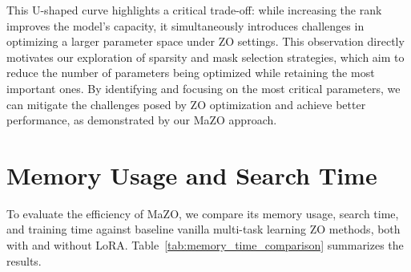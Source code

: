 This U-shaped curve highlights a critical trade-off: while increasing the rank improves the model's capacity, it simultaneously introduces challenges in optimizing a larger parameter space under ZO settings. This observation directly motivates our exploration of sparsity and mask selection strategies, which aim to reduce the number of parameters being optimized while retaining the most important ones. By identifying and focusing on the most critical parameters, we can mitigate the challenges posed by ZO optimization and achieve better performance, as demonstrated by our MaZO approach.

\section{Memory Usage and Search Time}
\label{sec:memory usage}

To evaluate the efficiency of MaZO, we compare its memory usage, search time, and training time against baseline vanilla multi-task learning ZO methods, both with and without LoRA. Table~\ref{tab:memory_time_comparison} summarizes the results.

\begin{table}[t]
\centering
{}
\caption{Comparison of memory usage, search time, and training time between MTL-ZO and MaZO, with and without LoRA. \textit{MTL} refers to multi-task learning. While MaZO introduces marginal memory and runtime overhead due to the mask storage and search process, it achieves significantly better accuracy as shown in Tables 1 and 2, demonstrating its effectiveness and practicality. Note that the memory requirement exceeds the model size (7B) because we use a batch size of 16 and a maximum token length of 600. }
\vspace{-10pt} 
\label{tab:memory_time_comparison}
\end{table}

